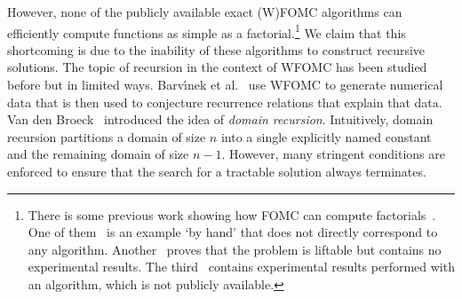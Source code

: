 \documentclass{article}
\theoremstyle{definition}
\begin{document}
However, none of the publicly available exact (W)FOMC algorithms can efficiently
compute functions as simple as a factorial.\footnote{There is some previous work
  showing how FOMC can compute
  factorials~\cite{DBLP:journals/jair/Kuzelka21,DBLP:conf/kr/BremenK21,DBLP:conf/ijcai/Broeck16}.
  One of them~\cite{DBLP:conf/ijcai/Broeck16} is an example `by hand' that does
  not directly correspond to any algorithm.
  Another~\cite{DBLP:journals/jair/Kuzelka21} proves that the problem is
  liftable but contains no experimental results. The
  third~\cite{DBLP:conf/kr/BremenK21} contains experimental results performed
  with an algorithm, which is not publicly available.} We claim that this
shortcoming is due to the inability of these algorithms to construct recursive
solutions. The topic of recursion in the context of WFOMC has been studied
before but in limited ways. Barv{\'{\i}}nek et
al.~ use WFOMC to generate numerical
data that is then used to conjecture recurrence relations that explain that
data. Van den Broeck~ introduced the idea of
\emph{domain recursion}. Intuitively, domain recursion partitions a domain of
size $n$ into a single explicitly named constant and the remaining domain of
size $n-1$. However, many stringent conditions are enforced to ensure that the
search for a tractable solution always terminates.



\end{document}
